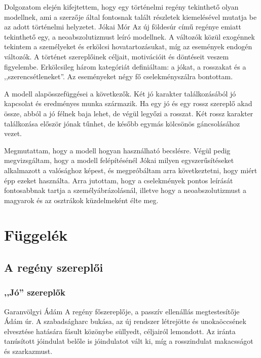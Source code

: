\documentclass[a4paper,12pt]{thesis-ekf}
\begin{document}
    Dolgozatom elején kifejtettem, hogy egy történelmi regény tekinthető olyan modellnek, ami a szerzője által
        fontosnak talált részletek kiemelésével mutatja be az adott történelmi helyzetet.
    Jókai Mór Az új földesúr című regénye emiatt tekinthető egy, a neoabszolutizmust leíró modellnek.
    A változók közül exogénnek tekintem a személyeket és erkölcsi hovatartozásukat, míg az események endogén változók.
    A történet szereplőinek céljait, motivációit és döntéseit veszem figyelembe.
    Erkölcsileg három kategóriát definiáltam: a jókat, a rosszakat és a ,,szerencsétleneket''.
    Az eseményeket négy fő cselekményszálra bontottam.

    A modell alapösszefüggései a következők.
    Két jó karakter találkozásából jó kapcsolat és eredményes munka származik.
    Ha egy jó és egy rossz szereplő akad össze, abból a jó félnek baja lehet, de végül legyőzi a rosszat.
    Két rossz karakter találkozása először jónak tűnhet, de később egymás kölcsönös gáncsolásához vezet.

    Megmutattam, hogy a modell hogyan használható becslésre.
    Végül pedig megvizsgáltam, hogy a modell felépítésénél Jókai milyen egyszerűsítéseket alkalmazott a valósághoz képest,
        és megpróbáltam arra következtetni, hogy miért épp ezeket használta.
    Arra jutottam, hogy a cselekmények pontos leírását fontosabbnak tartja a személyábrázolásnál,
        illetve hogy a neoabszolutizmust a magyarok és az osztrákok küzdelmeként élte meg.

    \chapter{Függelék}

    \section{A regény szereplői}

    \subsection{,,Jó'' szereplők}

    Garanvölgyi Ádám
    A regény főszereplője, a passzív ellenállás megtestesítője Ádám úr. A szabadságharc bukása, az új rendszer létrejötte és unokaöccsének elvesztése hatására fásult közönybe süllyedt, céljairól lemondott. Az iránta tanúsított jóindulat belőle is jóindulatot vált ki, míg a rosszindulat makacsságot és szarkazmust.
\end{document}
